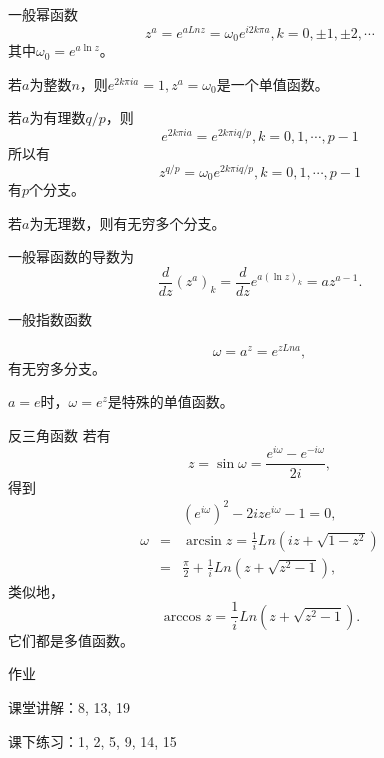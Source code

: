 \documentclass[11pt]{beamer}
\newcommand{\kong}[1][0.5]{\vspace{#1cm}}
\begin{document}
\begin{frame}{一般幂函数}
\begin{equation}
z^a = e^{a Ln z} = \omega_0 e^{i 2k\pi a}, k=0, \pm 1, \pm 2, \cdots
\end{equation}
其中$\omega_0 = e^{a \ln z}$。

\kong[0.5]
若$a$为整数$n$，则$e^{2k\pi i a} = 1, z^a = \omega_0$是一个单值函数。

\kong[0.5]
若$a$为有理数$q/p$，则
\begin{equation}
e^{2k\pi i a} = e^{2k\pi i q/p}, k=0,1,\cdots,p-1
\end{equation}
所以有
\begin{equation}
z^{q/p} = \omega_0 e^{2k\pi i q/p}, k=0,1,\cdots,p-1
\end{equation}
有$p$个分支。

\kong[0.5]
若$a$为无理数，则有无穷多个分支。

一般幂函数的导数为
\begin{equation}
\frac{d}{dz}(z^a)_k = \frac{d}{dz} e^{a(\ln z)_k} = a z^{a-1}.
\end{equation}

\end{frame}

\begin{frame}{一般指数函数}

\begin{equation}
\omega = a^z = e^{z Ln a},
\end{equation}
有无穷多分支。

\kong[0.5]
$a=e$时，$\omega = e^z$是特殊的单值函数。
\end{frame}

\begin{frame}{反三角函数}
若有
\begin{equation}
z = \sin \omega = \frac{ e^{i\omega} - e^{-i\omega}}{2i},
\end{equation}
得到
\begin{eqnarray}
&& (e^{i\omega})^2 - 2i z e^{i\omega} -1 = 0, \\
\omega &=& \arcsin z = \frac{1}{i} Ln (iz + \sqrt{1-z^2} ) \\
       &=& \frac{\pi}{2} + \frac{1}{i} Ln (z + \sqrt{z^2 -1}),
\end{eqnarray}
类似地，
\begin{equation}
\arccos z = \frac{1}{i} Ln (z + \sqrt{z^2 -1} ).
\end{equation}
它们都是多值函数。
\end{frame}

\begin{frame}{作业}

\kong[0.5]
课堂讲解：8, 13, 19

\kong[0.5]
课下练习：1, 2, 5, 9, 14, 15
\end{frame}
\end{document}
